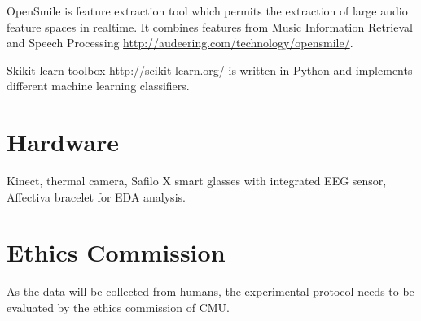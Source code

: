 OpenSmile is feature extraction tool which permits the extraction of large audio feature spaces in realtime. It combines features from Music Information Retrieval and Speech Processing \url{http://audeering.com/technology/opensmile/}.

Skikit-learn toolbox \url{http://scikit-learn.org/} is written in Python and implements different machine learning classifiers.


\section{Hardware}
\label{sec:hardware}
Kinect, thermal camera, Safilo X smart glasses with integrated EEG sensor, Affectiva bracelet for EDA analysis. 






\section{Ethics Commission}

As the data will be collected from humans, the experimental protocol needs to be evaluated by the ethics commission of CMU.


